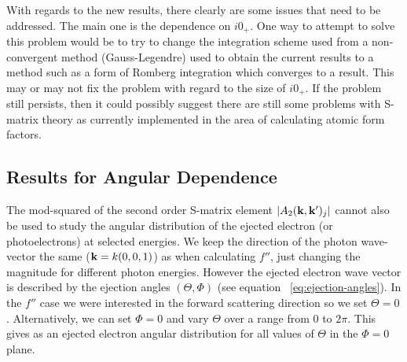 With regards to the new results, there clearly are some issues that need
to be addressed. The main one is the dependence on $i0_+$. One way to attempt
to solve this problem would be to try to change the integration scheme used 
from a non-convergent method (Gauss-Legendre) used to obtain the current results
to a method such as a form of Romberg integration which converges to a result.
This may or may not fix the problem with regard to the size of $i0_+$.
If the problem still persists, then it could possibly suggest there are still
some problems with S-matrix theory as currently implemented in the area of
calculating atomic form factors.

\subsection{Results for Angular Dependence}
The mod-squared of the second order S-matrix element $|A_2(\mathbf{k},\mathbf{k'})_j|$
cannot also be used to study the angular distribution of the ejected electron
(or photoelectrons) at selected energies. We keep the direction
of the photon wave-vector the same ($\mathbf{k} = k(0,0,1)$) as when calculating
$f''$, just changing the magnitude for different photon energies. 
However the ejected electron wave vector is described by the ejection
angles $(\Theta,\Phi)$ (see equation ~\ref{eq:ejection-angles}). 
In the $f''$ case we were interested in the forward scattering direction
so we set $\Theta = 0$. Alternatively, we can set $\Phi = 0$ and vary
$\Theta$ over a range from $0$ to $2 \pi$. 
This gives as an ejected electron angular distribution for all values of $\Theta$ in
the $\Phi = 0$ plane.

